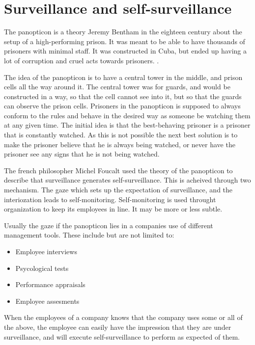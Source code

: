 \section{Surveillance and self-surveillance}
The panopticon is a theory Jeremy Bentham in the eighteen century about the setup of a high-performing prison. It was meant to be able to have thousands of prisoners with minimal staff. It was constructed in Cuba, but ended up having a lot of corruption and cruel acts towards prisoners. \cite{website:panopticon-idea}.

The idea of the panopticon is to have a central tower in the middle, and prison cells all the way around it. The central tower was for guards, and would be constructed in a way, so that the cell cannot see into it, but so that the guards can observe the prison cells. Prisoners in the panopticon is supposed to always conform to the rules and behave in the desired way as someone  be watching them at any given time. The initial idea is that the best-behaving prisoner is a prisoner that is constantly watched. As this is not possible the next best solution is to make the prisoner believe that he is always being watched, or never have the prisoner see any signs that he is not being watched.\cite{book:organization-theory}

The french philosopher Michel Foucalt used the theory of the panopticon to describe that surveillance generates self-surveillance. This is acheived through two mechanism. The gaze which sets up the expectation of surveillance, and the interiozation leads to self-monitoring. Self-monitoring is used throught organization to keep its employees in line. It may be more or less subtle.\cite{book:organization-theory}

Usually the gaze if the panopticon lies in a companies use of different management tools. These include but are not limited to:
\begin{itemize}
  \item{Employee interviews}
  \item{Psycological tests}
  \item{Performance appraisals}
  \item{Employee assesments}
\end{itemize}

When the employees of a company knows that the company uses some or all of the above, the employee can easily have the impression that they are under surveillance, and will execute self-surveillance to perform as expected of them.\cite{book:organization-theory}

\newpage
